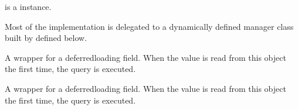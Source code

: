 \documentclass[letterpaper,10pt,english]{sphinxmanual}
\begin{document}
\begin{fulllineitems}
\begin{fulllineitems}
\sphinxAtStartPar
{} is a  instance.

\sphinxAtStartPar
Most of the implementation is delegated to a dynamically defined manager
class built by  defined below.

\end{fulllineitems}


\begin{fulllineitems}
\label{\detokenize{models/user:api.models.user.User.name}}
\pysigstartsignatures
{}
\pysigstopsignatures
\sphinxAtStartPar
A wrapper for a deferred\sphinxhyphen{}loading field. When the value is read from this
object the first time, the query is executed.

\end{fulllineitems}


\begin{fulllineitems}
\label{\detokenize{models/user:api.models.user.User.student}}
\pysigstartsignatures
{}
\pysigstopsignatures
\end{fulllineitems}


\begin{fulllineitems}
\label{\detokenize{models/user:api.models.user.User.student_nuid}}
\pysigstartsignatures
{}
\pysigstopsignatures
\sphinxAtStartPar
A wrapper for a deferred\sphinxhyphen{}loading field. When the value is read from this
object the first time, the query is executed.

\end{fulllineitems}



\end{fulllineitems}
\end{document}

